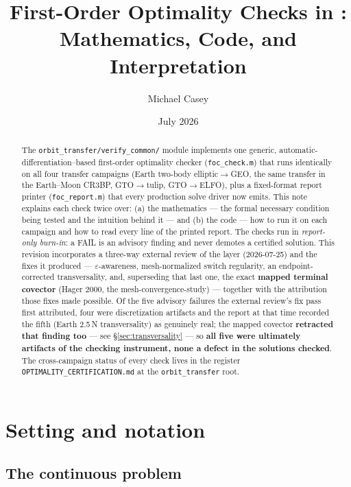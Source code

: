 \documentclass[11pt]{article}
\title{First-Order Optimality Checks in \file{verify\_common}:\\
Mathematics, Code, and Interpretation}
\author{Michael Casey}
\date{July 2026}
\newcommand{\file}[1]{\texttt{#1}}
\begin{document}
\maketitle

\begin{abstract}
\noindent\sloppy
The \file{orbit\_transfer/verify\_common/} module implements one generic,
automatic-differentiation--based first-order optimality checker
(\file{foc\_check.m}) that runs identically on all four transfer campaigns
(Earth two-body elliptic$\to$GEO, the same transfer in the Earth--Moon CR3BP,
GTO$\to$tulip, GTO$\to$ELFO), plus a fixed-format report printer
(\file{foc\_report.m}) that every production solve driver now emits. This note
explains each check twice over: (a) the mathematics --- the formal necessary
condition being tested and the intuition behind it --- and (b) the code --- how
to run it on each campaign and how to read every line of the printed report.
The checks run in \emph{report-only burn-in}: a FAIL is an advisory finding and
never demotes a certified solution. This revision incorporates a three-way
external review of the layer (2026-07-25) and the fixes it produced ---
$\varepsilon$-awareness, mesh-normalized switch regularity, an
endpoint-corrected transversality, and, superseding that last one, the exact
\textbf{mapped terminal covector} (Hager 2000, the
mesh-convergence-study) --- together with the attribution those fixes made
possible. Of the five advisory failures the external review's fix pass first
attributed, four were discretization artifacts and the report at that time
recorded the fifth (Earth 2.5\,N transversality) as genuinely real; the
mapped covector \textbf{retracted that finding too} --- see
\S\ref{sec:transversality} --- so \textbf{all five were ultimately
artifacts of the checking instrument, none a defect in the solutions
checked}. The cross-campaign status of every
check lives in the register \file{OPTIMALITY\_CERTIFICATION.md} at the
\file{orbit\_transfer} root.
\end{abstract}

\tableofcontents

\section{Setting and notation}
\label{sec:setting}

\subsection{The continuous problem}
\end{document}
